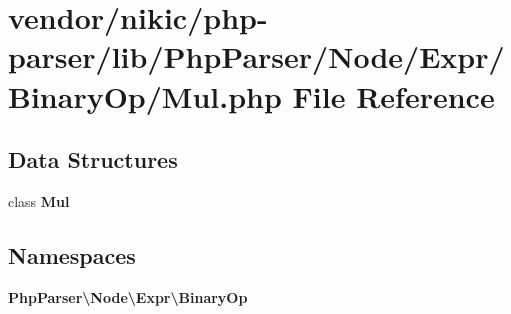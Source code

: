 \section{vendor/nikic/php-\/parser/lib/\+Php\+Parser/\+Node/\+Expr/\+Binary\+Op/\+Mul.php File Reference}
\label{_binary_op_2_mul_8php}
\subsection*{Data Structures}
\begin{DoxyCompactItemize}
\item 
class {\bf Mul}
\end{DoxyCompactItemize}
\subsection*{Namespaces}
\begin{DoxyCompactItemize}
\item 
 {\bf Php\+Parser\textbackslash{}\+Node\textbackslash{}\+Expr\textbackslash{}\+Binary\+Op}
\end{DoxyCompactItemize}
